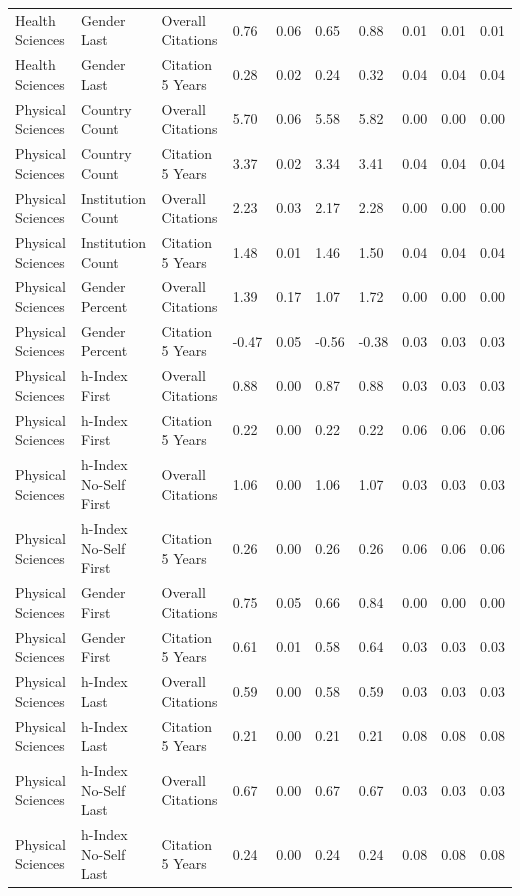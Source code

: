 \documentclass[
  man,floatsintext]{apa6}
\begin{document}
\begin{table}[tbp]
\begin{center}
\begin{threeparttable}
{\begin{tabular}{llllllllll}
Health Sciences & Gender Last & Overall Citations & 0.76 & 0.06 & 0.65 & 0.88 & 0.01 & 0.01 & 0.01\\
Health Sciences & Gender Last & Citation 5 Years & 0.28 & 0.02 & 0.24 & 0.32 & 0.04 & 0.04 & 0.04\\
Physical Sciences & Country Count & Overall Citations & 5.70 & 0.06 & 5.58 & 5.82 & 0.00 & 0.00 & 0.00\\
Physical Sciences & Country Count & Citation 5 Years & 3.37 & 0.02 & 3.34 & 3.41 & 0.04 & 0.04 & 0.04\\
Physical Sciences & Institution Count & Overall Citations & 2.23 & 0.03 & 2.17 & 2.28 & 0.00 & 0.00 & 0.00\\
Physical Sciences & Institution Count & Citation 5 Years & 1.48 & 0.01 & 1.46 & 1.50 & 0.04 & 0.04 & 0.04\\
Physical Sciences & Gender Percent & Overall Citations & 1.39 & 0.17 & 1.07 & 1.72 & 0.00 & 0.00 & 0.00\\
Physical Sciences & Gender Percent & Citation 5 Years & -0.47 & 0.05 & -0.56 & -0.38 & 0.03 & 0.03 & 0.03\\
Physical Sciences & h-Index First & Overall Citations & 0.88 & 0.00 & 0.87 & 0.88 & 0.03 & 0.03 & 0.03\\
Physical Sciences & h-Index First & Citation 5 Years & 0.22 & 0.00 & 0.22 & 0.22 & 0.06 & 0.06 & 0.06\\
Physical Sciences & h-Index No-Self First & Overall Citations & 1.06 & 0.00 & 1.06 & 1.07 & 0.03 & 0.03 & 0.03\\
Physical Sciences & h-Index No-Self First & Citation 5 Years & 0.26 & 0.00 & 0.26 & 0.26 & 0.06 & 0.06 & 0.06\\
Physical Sciences & Gender First & Overall Citations & 0.75 & 0.05 & 0.66 & 0.84 & 0.00 & 0.00 & 0.00\\
Physical Sciences & Gender First & Citation 5 Years & 0.61 & 0.01 & 0.58 & 0.64 & 0.03 & 0.03 & 0.03\\
Physical Sciences & h-Index Last & Overall Citations & 0.59 & 0.00 & 0.58 & 0.59 & 0.03 & 0.03 & 0.03\\
Physical Sciences & h-Index Last & Citation 5 Years & 0.21 & 0.00 & 0.21 & 0.21 & 0.08 & 0.08 & 0.08\\
Physical Sciences & h-Index No-Self Last & Overall Citations & 0.67 & 0.00 & 0.67 & 0.67 & 0.03 & 0.03 & 0.03\\
Physical Sciences & h-Index No-Self Last & Citation 5 Years & 0.24 & 0.00 & 0.24 & 0.24 & 0.08 & 0.08 & 0.08\\

\end{tabular}}
\end{threeparttable}
\end{center}
\end{table}
\end{document}
